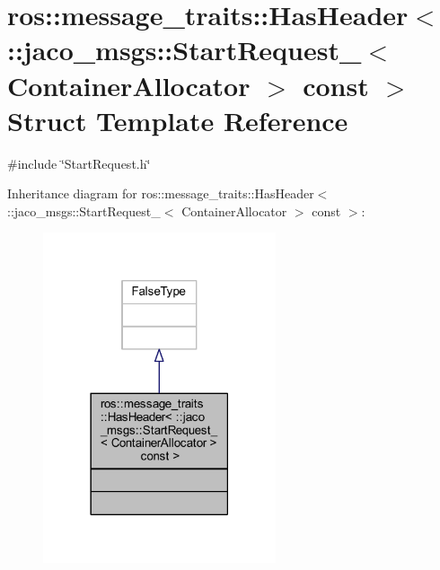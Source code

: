 \hypertarget{structros_1_1message__traits_1_1HasHeader_3_01_1_1jaco__msgs_1_1StartRequest___3_01ContainerAllocator_01_4_01const_01_01_4}{}\section{ros\+:\+:message\+\_\+traits\+:\+:Has\+Header$<$ \+:\+:jaco\+\_\+msgs\+:\+:Start\+Request\+\_\+$<$ Container\+Allocator $>$ const $>$ Struct Template Reference}
\label{structros_1_1message__traits_1_1HasHeader_3_01_1_1jaco__msgs_1_1StartRequest___3_01ContainerAllocator_01_4_01const_01_01_4}


{\ttfamily \#include \char`\"{}Start\+Request.\+h\char`\"{}}



Inheritance diagram for ros\+:\+:message\+\_\+traits\+:\+:Has\+Header$<$ \+:\+:jaco\+\_\+msgs\+:\+:Start\+Request\+\_\+$<$ Container\+Allocator $>$ const $>$\+:
\nopagebreak
\begin{figure}[H]
\begin{center}
\leavevmode
\includegraphics[width=194pt]{d2/d98/structros_1_1message__traits_1_1HasHeader_3_01_1_1jaco__msgs_1_1StartRequest___3_01ContainerAllof54a7e2dc1f5e7aafa81fd4145fc1403}
\end{center}
\end{figure}


